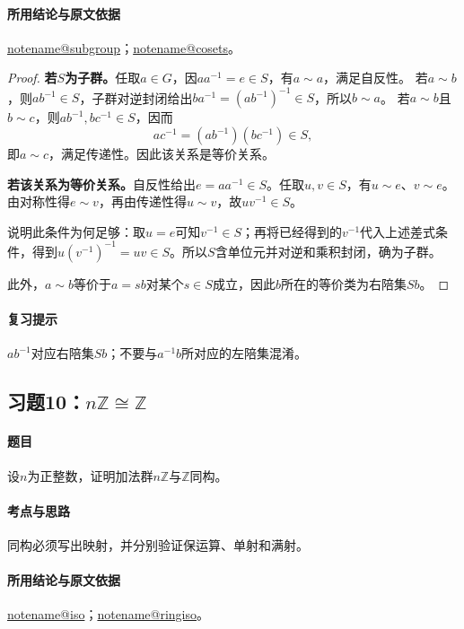 \documentclass[UTF8,a4paper,11pt,fontset=windows]{ctexart}
\makeatletter
\newcommand{\Z}{\mathbb Z}\newcommand{\Q}{\mathbb Q}
\newcommand{\noteref}[1]{\hyperref[note:#1]{\csname notename@#1\endcsname}}
\newcommand{\exref}[2]{\hyperref[ex:#1:#2]{第#1章习题#2}}
\makeatother
\begin{document}
\paragraph{所用结论与原文依据}
\noteref{subgroup}；\noteref{cosets}。


\begin{proof}
\textbf{若$S$为子群。}任取$a\in G$，因$aa^{-1}=e\in S$，有$a\sim a$，满足自反性。
若$a\sim b$，则$ab^{-1}\in S$，子群对逆封闭给出$ba^{-1}=(ab^{-1})^{-1}\in S$，所以$b\sim a$。
若$a\sim b$且$b\sim c$，则$ab^{-1},bc^{-1}\in S$，因而
\[
ac^{-1}=(ab^{-1})(bc^{-1})\in S,
\]
即$a\sim c$，满足传递性。因此该关系是等价关系。

\textbf{若该关系为等价关系。}自反性给出$e=aa^{-1}\in S$。任取$u,v\in S$，有$u\sim e$、$v\sim e$。由对称性得$e\sim v$，再由传递性得$u\sim v$，故$uv^{-1}\in S$。

说明此条件为何足够：取$u=e$可知$v^{-1}\in S$；再将已经得到的$v^{-1}$代入上述差式条件，得到$u(v^{-1})^{-1}=uv\in S$。所以$S$含单位元并对逆和乘积封闭，确为子群。

此外，$a\sim b$等价于$a=sb$对某个$s\in S$成立，因此$b$所在的等价类为右陪集$Sb$。
\end{proof}

\paragraph{复习提示}
$ab^{-1}$对应右陪集$Sb$；不要与$a^{-1}b$所对应的左陪集混淆。


\subsection{习题10：\texorpdfstring{$n\Z\cong\Z$}{nZ同构于Z}}
\label{ex:1:10}

\paragraph{题目}
设$n$为正整数，证明加法群$n\Z$与$\Z$同构。

\paragraph{考点与思路}
同构必须写出映射，并分别验证保运算、单射和满射。

\paragraph{所用结论与原文依据}
\noteref{iso}；\noteref{ringiso}。
\end{document}

